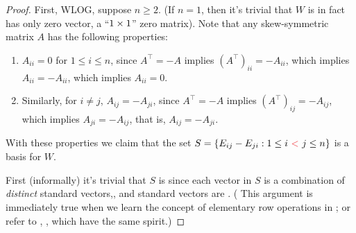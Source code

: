 \begin{proof}
First, WLOG, suppose \(n \ge 2\).
(If \(n = 1\), then it's trivial that \(W\) is in fact has only zero vector, a ``\(1 \times 1\)'' zero matrix).
Note that any skew-symmetric matrix \(A\) has the following properties:
\begin{enumerate}
    \item \(A_{ii} = 0\) for \(1 \le i \le n\), since \(A^\top = -A\) implies \((A^\top)_{ii} = -A_{ii}\), which implies \(A_{ii} = -A_{ii}\), which implies \(A_{ii} = 0\).
    \item Similarly, for \(i \ne j\), \(A_{ij} = -A_{ji}\), since \(A^\top = -A\) implies \((A^\top)_{ij} = -A_{ij}\), which implies \(A_{ji} = -A_{ij}\), that is, \(A_{ij} = -A_{ji}\).
\end{enumerate}
With these properties we claim that the set \(S = \{ E_{ij} - E_{ji} : 1 \le i\ \RED{<}\ j \le n \}\) is a basis for \(W\).

First (informally) it's trivial that \(S\) is \LID{} since each vector in \(S\) is a combination of \emph{distinct} standard vectors,, and standard vectors are \LID{}.
(\TODOREF{} This argument is immediately true when we learn the concept of elementary row operations in ; or refer to , , which have the same spirit.)


\end{proof}
